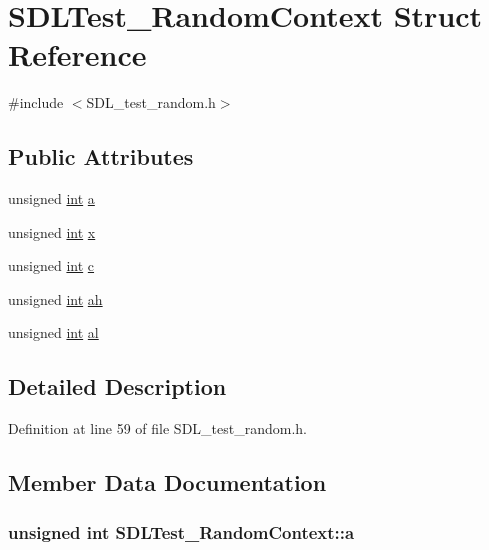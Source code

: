 \hypertarget{struct_s_d_l_test___random_context}{\section{S\-D\-L\-Test\-\_\-\-Random\-Context Struct Reference}
\label{struct_s_d_l_test___random_context}
}


{\ttfamily \#include $<$S\-D\-L\-\_\-test\-\_\-random.\-h$>$}

\subsection*{Public Attributes}
\begin{DoxyCompactItemize}
\item 
unsigned \hyperlink{_s_d_l__thread_8h_a6a64f9be4433e4de6e2f2f548cf3c08e}{int} \hyperlink{struct_s_d_l_test___random_context_a24f830d6cb476c96fbe325c99331e45f}{a}
\item 
unsigned \hyperlink{_s_d_l__thread_8h_a6a64f9be4433e4de6e2f2f548cf3c08e}{int} \hyperlink{struct_s_d_l_test___random_context_a8bd6d1b4e1677ed1c06f5cc09f1af5b6}{x}
\item 
unsigned \hyperlink{_s_d_l__thread_8h_a6a64f9be4433e4de6e2f2f548cf3c08e}{int} \hyperlink{struct_s_d_l_test___random_context_a17a6a7e7b68a33c67d9b74c8c7c33198}{c}
\item 
unsigned \hyperlink{_s_d_l__thread_8h_a6a64f9be4433e4de6e2f2f548cf3c08e}{int} \hyperlink{struct_s_d_l_test___random_context_a2c8d2f1ee16cdfd38361b8f03b3fdb85}{ah}
\item 
unsigned \hyperlink{_s_d_l__thread_8h_a6a64f9be4433e4de6e2f2f548cf3c08e}{int} \hyperlink{struct_s_d_l_test___random_context_a0e2bccd3611d383d6510c6c828aa54c4}{al}
\end{DoxyCompactItemize}


\subsection{Detailed Description}


Definition at line 59 of file S\-D\-L\-\_\-test\-\_\-random.\-h.



\subsection{Member Data Documentation}
\hypertarget{struct_s_d_l_test___random_context_a24f830d6cb476c96fbe325c99331e45f}{
\subsubsection[{a}]{\setlength{\rightskip}{0pt plus 5cm}unsigned {\bf int} S\-D\-L\-Test\-\_\-\-Random\-Context\-::a}}\label{struct_s_d_l_test___random_context_a24f830d6cb476c96fbe325c99331e45f}


